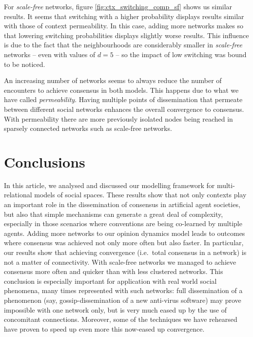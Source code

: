 \documentclass[preprint,number]{elsarticle}
\begin{document}
For \textit{scale-free} networks, figure \ref{fig:ctx_switching_comp_sf} shows us similar
results. It seems that switching with a higher probability displays results similar with those of
context permeability. In this case, adding more networks makes so that lowering switching
probabilities displays slightly worse results. This influence is due to the fact that the
neighbourhoods are considerably smaller in \textit{scale-free} networks -- even with values of $d=5$ -- so the impact of low switching was bound to be noticed.

An increasing number of networks seems to always reduce the number of encounters to achieve consensus in both models. This happens due to what we have called \textit{permeability}. Having multiple points of dissemination that permeate between different social networks enhances the overall convergence to consensus. With permeability there are more previously isolated nodes being reached in sparsely connected networks such as scale-free networks. 

\section{Conclusions}
\label{sec:conclusion-future}
\noindent In this article, we analysed and discussed our modelling framework for multi-relational models of social spaces. These results show that not only contexts play an important role in the dissemination of consensus in artificial agent societies, but also that simple mechanisms can generate a great deal of complexity, especially in those scenarios where conventions are being co-learned by multiple agents. Adding more networks to our opinion dynamics model leads to outcomes where consensus was achieved not only more often but also faster. In particular, our results show that achieving convergence (i.e.\ total consensus in a network) is not a matter of connectivity. With scale-free networks we managed to achieve consensus more often and quicker than with less clustered networks. This conclusion is especially important for application with real world social phenomena, many times represented with such networks: full dissemination of a phenomenon (say, gossip-dissemination of a new anti-virus software) may prove impossible with one network only, but is very much eased up by the use of concomitant connections. Moreover, some of the techniques we have rehearsed have proven to speed up even more this now-eased up convergence.
\end{document}
